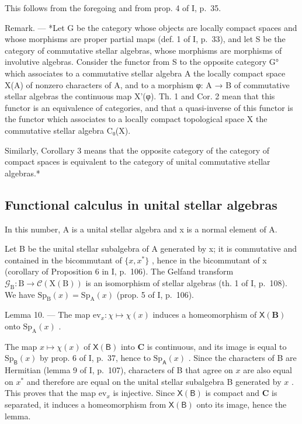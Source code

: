 This follows from the foregoing and from prop. 4 of I, p.~35.

Remark. --- *Let G be the category whose objects are locally compact spaces and whose morphisms are proper partial maps (def. 1 of I, p.~33), and let S be the category of commutative stellar algebras, whose morphisms are morphisms of involutive algebras. Consider the functor from S to the opposite category G° which associates to a commutative stellar algebra A the locally compact space X(A) of nonzero characters of A, and to a morphism φ: A → B of commutative stellar algebras the continuous map X'(φ). Th. 1 and Cor. 2 mean that this functor is an equivalence of categories, and that a quasi-inverse of this functor is the functor which associates to a locally compact topological space X the commutative stellar algebra C₀(X).

Similarly, Corollary 3 means that the opposite category of the category of compact spaces is equivalent to the category of unital commutative stellar algebras.*

\subsection{Functional calculus in unital stellar algebras}

In this number, A is a unital stellar algebra and x is a normal element of A.

Let B be the unital stellar subalgebra of A generated by x; it is commutative and contained in the bicommutant of \(\{x, x^{*}\}\) , hence in the bicommutant of x (corollary of Proposition 6 in I, p.~106). The Gelfand transform \(\mathcal{G}_{\mathrm{B}}: \mathrm{B} \to \mathcal{C}(\mathrm{X}(\mathrm{B}))\) is an isomorphism of stellar algebras (th. 1 of I, p.~108). We have \(\mathrm{Sp}_{\mathrm{B}}(x) = \mathrm{Sp}_{\mathrm{A}}(x)\) (prop. 5 of I, p.~106).

Lemma 10. --- The map \(\mathrm{ev}_x\colon \chi \mapsto \chi (x)\) induces a homeomorphism of \(\mathsf{X}(\mathbf{B})\) onto \(\mathrm{Sp}_{\mathrm{A}}(x)\) .

The map \(x \mapsto \chi(x)\) of \(\mathsf{X}(\mathsf{B})\) into \(\mathbf{C}\) is continuous, and its image is equal to \(\mathrm{Sp}_{\mathsf{B}}(x)\) by prop. 6 of I, p.~37, hence to \(\mathrm{Sp}_{\mathsf{A}}(x)\) . Since the characters of B are Hermitian (lemma 9 of I, p.~107), characters of B that agree on \(x\) are also equal on \(x^{*}\) and therefore are equal on the unital stellar subalgebra B generated by \(x\) . This proves that the map \(\mathrm{ev}_x\) is injective. Since \(\mathsf{X}(\mathsf{B})\) is compact and \(\mathbf{C}\) is separated, it induces a homeomorphism from \(\mathsf{X}(\mathsf{B})\) onto its image, hence the lemma.

